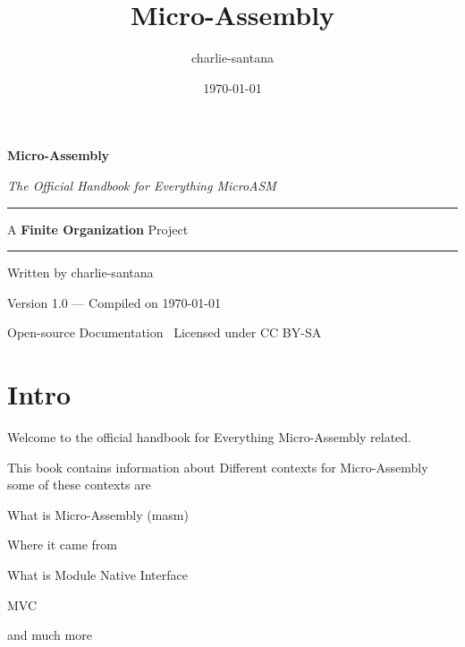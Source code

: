 \documentclass[a4paper,11pt]{book}
\begin{document}
\title{Micro-Assembly}
\author{charlie-santana}
\date{\today}

\begin{titlepage}
	\centering
	\vspace*{3cm}
	
	{\Huge\bfseries\textsf{\color{microblue} Micro}\color{black}-Assembly}\par
	\vspace{0.6cm}
	{\Large\itshape The Official Handbook for Everything MicroASM}\par
	
	\vspace{2.5cm}
	
	\rule{0.8\textwidth}{0.5pt}\par
	\vspace{0.4cm}
	{\large A \textbf{Finite Organization} Project}\par
	\rule{0.8\textwidth}{0.5pt}\par
	
	\vspace{2cm}
	
	{\large Written by charlie-santana}\par
	\vspace{0.2cm}
	{\small Version 1.0 — Compiled on \today}\par
	
	\vfill
	
	{\footnotesize Open-source Documentation \textbullet\ Licensed under CC BY-SA}\par
\end{titlepage}


\tableofcontents
\chapter{Intro}
Welcome to the official handbook for Everything Micro-Assembly related.

This book contains information about Different contexts for Micro-Assembly
some of these contexts are
\begin{list}{*}{}
	\item What is Micro-Assembly (masm)
	\item Where it came from
	\item What is Module Native Interface
	\item MVC
	\item and much more
\end{list}
\end{document}
